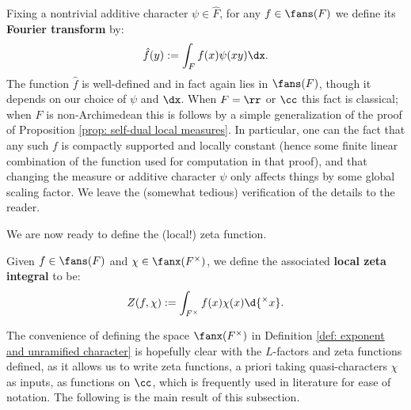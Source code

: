 \documentclass[11pt, x11names, openany]{book}
\begin{document}
Fixing a nontrivial additive character $\psi \in \hat{F}$, for any $f \in \fans(F)$ we define its \textbf{Fourier transform} by:
\begin{equation}
\label{eqn: Fourier transform local-zeta-func}
    \hat{f}(y) := \int_F f(x)\psi(xy)\dx.
\end{equation}
The function $\hat{f}$ is well-defined and in fact again lies in $\fans(F)$, though it depends on our choice of $\psi$ and $\dx$. When $F = \rr$ or $\cc$ this fact is classical; when $F$ is non-Archimedean this is follows by a simple generalization of the proof of Proposition \ref{prop: self-dual local measures}. In particular, one can the fact that any such $f$ is compactly supported and locally constant (hence some finite linear combination of the function used for computation in that proof), and that changing the measure or additive character $\psi$ only affects things by some global scaling factor. We leave the (somewhat tedious) verification of the details to the reader.

We are now ready to define the (local!) zeta function.

\begin{defn}
\label{def: local zeta function}
    Given $f \in \fans(F)$ and $\chi \in \fanx(F^\times)$, we define the associated \textbf{local zeta integral} to be:
    \begin{equation*}
        Z(f, \chi) := \int_{F^\times} f(x)\chi(x)\d{^\times x}.
    \end{equation*} 
\end{defn}

The convenience of defining the space $\fanx(F^\times)$ in Definition \ref{def: exponent and unramified character} is hopefully clear with the $L$-factors and zeta functions defined, as it allows us to write zeta functions, a priori taking quasi-characters $\chi$ as inputs, as functions on $\cc$, which is frequently used in literature for ease of notation. The following is the main result of this subsection.
\end{document}
